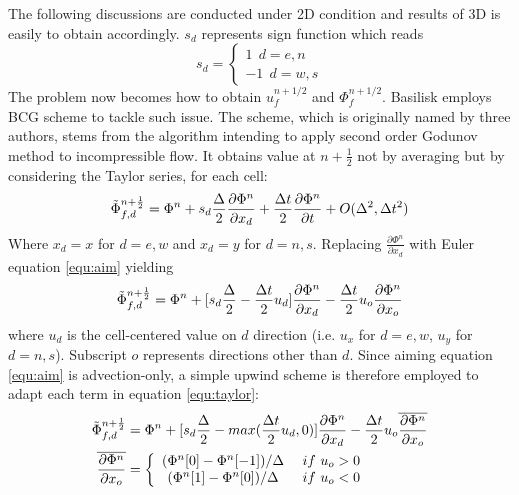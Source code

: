 \documentclass[a4paper]{article}
\begin{document}
The following discussions are conducted under 2D condition and results of 3D is easily to obtain accordingly. $s_d$ represents sign function which reads
\begin{equation}
    s_d = 
    \left\{
    \begin{array}{cc}
    1\ \ d=e,n \\
    -1\ \ d=w,s
    \end{array}
    \right.
\end{equation}
The problem now becomes how to obtain $u_f^{n+1/2}$ and $\Phi_f^{n+1/2}$. Basilisk employs BCG scheme to tackle such issue. The scheme, which is originally named by three authors\cite{1989_Bell}, stems from the algorithm intending to apply second order Godunov method to incompressible flow. It obtains value at $n+\frac{1}{2}$ not by averaging but by considering the Taylor series, for each cell:
\begin{equation}
  \Tilde{\Phi}^{n+ \frac{1}{2}}_{f,d} = \Phi^n+ s_d\frac{\Delta}{2} \frac{\partial \Phi^n}{\partial x_d} + \frac{\Delta t}{2} \frac{\partial \Phi^n}{\partial t} + O(\Delta^2,\Delta t^2)
\end{equation}
Where $x_d=x$ for $d = e,w$ and $x_d=y$ for $d = n,s$. Replacing $ \frac{\partial \Phi^n}{\partial x_d}$ with Euler equation \ref{equ:aim} yielding 
\begin{equation}
  \Tilde{\Phi}^{n+ \frac{1}{2}}_{f,d} = \Phi^n + [s_d \frac{\Delta}{2}- \frac{\Delta t}{2} u_d] \frac{\partial \Phi^n}{\partial x_d} - \frac{\Delta t}{2} u_o \frac{\partial \Phi^n}{\partial x_o}\label{equ:taylor}
\end{equation}
where $u_d$ is the cell-centered value on $d$ direction (i.e. $u_x$ for $d = e,w$, $u_y$ for $d = n,s$). Subscript $o$ represents directions other than $d$.
Since aiming equation \ref{equ:aim} is advection-only, a simple upwind scheme is therefore employed\cite{2000_Martin,1998_Martin} to adapt each term in equation \ref{equ:taylor}:
\begin{align}
  \Tilde{\Phi}^{n+ \frac{1}{2}}_{f,d} &= \Phi^n + [s_d \frac{\Delta}{2}- max(\frac{\Delta t}{2} u_d,0)] \frac{\partial \Phi^n}{\partial x_d} - \frac{\Delta t}{2} u_o \overline{\frac{\partial \Phi^n}{\partial x_o}}\label{equ:upwind} \\
  \overline{\frac{\partial \Phi^n}{\partial x_o}} &= \left\{
  \begin{array}{cc}
       (\Phi^n[0] - \Phi^n[-1])/\Delta&\ if\ u_o>0 \\
       (\Phi^n[1] - \Phi^n[0])/\Delta&\ if\ u_o<0
  \end{array}
  \right.\label{equ:upwind2}
\end{align}
\end{document}
